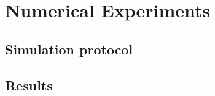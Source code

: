 


\chapter{Numerical Experiments}\label{ch3:NumExp}



\section{Simulation protocol}\label{ch3:SimProtocol}


\section{Results}\label{ch3:Results}


\newpage
